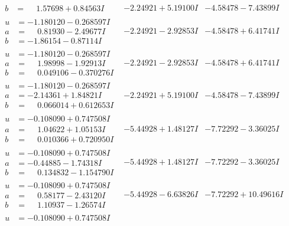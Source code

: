 \documentclass[1p]{elsarticle_modified}
\theoremstyle{definition}
\begin{document}
$$\begin{array}{c|c|c}
\begin{aligned}
b &= \phantom{-}1.57698 + 0.84563 I\end{aligned}
 & -2.24921 + 5.19100 I & -4.58478 - 7.43899 I \\ \hline\begin{aligned}
u &= -1.180120 - 0.268597 I \\
a &= \phantom{-}0.81930 - 2.49677 I \\
b &= -1.86154 - 0.87114 I\end{aligned}
 & -2.24921 - 2.92853 I & -4.58478 + 6.41741 I \\ \hline\begin{aligned}
u &= -1.180120 - 0.268597 I \\
a &= \phantom{-}1.98998 - 1.92913 I \\
b &= \phantom{-}0.049106 - 0.370276 I\end{aligned}
 & -2.24921 - 2.92853 I & -4.58478 + 6.41741 I \\ \hline\begin{aligned}
u &= -1.180120 - 0.268597 I \\
a &= -2.14361 + 1.84821 I \\
b &= \phantom{-}0.066014 + 0.612653 I\end{aligned}
 & -2.24921 + 5.19100 I & -4.58478 - 7.43899 I \\ \hline\begin{aligned}
u &= -0.108090 + 0.747508 I \\
a &= \phantom{-}1.04622 + 1.05153 I \\
b &= \phantom{-}0.010366 + 0.720950 I\end{aligned}
 & -5.44928 + 1.48127 I & -7.72292 - 3.36025 I \\ \hline\begin{aligned}
u &= -0.108090 + 0.747508 I \\
a &= -0.44885 - 1.74318 I \\
b &= \phantom{-}0.134832 - 1.154790 I\end{aligned}
 & -5.44928 + 1.48127 I & -7.72292 - 3.36025 I \\ \hline\begin{aligned}
u &= -0.108090 + 0.747508 I \\
a &= \phantom{-}0.58177 - 2.43120 I \\
b &= \phantom{-}1.10937 - 1.26574 I\end{aligned}
 & -5.44928 - 6.63826 I & -7.72292 + 10.49616 I \\ \hline\begin{aligned}
u &= -0.108090 + 0.747508 I \\

\end{aligned}
\end{array}$$
\end{document}
